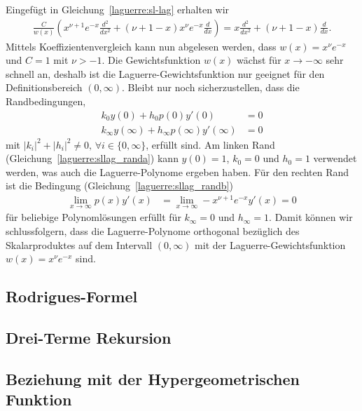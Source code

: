 Eingefügt in Gleichung~\eqref{laguerre:sl-lag} erhalten wir
\begin{align*}
\frac{C}{w(x)}
\left(
x^{\nu+1} e^{-x} \frac{d^2}{dx^2} +
(\nu + 1 - x) x^{\nu} e^{-x} \frac{d}{dx}
\right)
=
x \frac{d^2}{dx^2} + (\nu + 1 - x) \frac{d}{dx}.
\end{align*}
Mittels Koeffizientenvergleich kann nun abgelesen werden, dass $w(x) = x^\nu
e^{-x}$ und $C=1$ mit $\nu > -1$.
Die Gewichtsfunktion $w(x)$ wächst für $x\rightarrow-\infty$ sehr schnell an,
deshalb ist die Laguerre-Gewichtsfunktion nur geeignet für den
Definitionsbereich $(0, \infty)$.
Bleibt nur noch sicherzustellen, dass die Randbedingungen,
\begin{align}
k_0 y(0) + h_0 p(0)y'(0)
 & =
0
\label{laguerre:sllag_randa}
\\
k_\infty y(\infty) + h_\infty p(\infty) y'(\infty)
 & =
0
\label{laguerre:sllag_randb}
\end{align}
mit $|k_i|^2 + |h_i|^2 \neq 0,\,\forall i \in \{0, \infty\}$, erfüllt sind.
Am linken Rand (Gleichung~\eqref{laguerre:sllag_randa}) kann $y(0) = 1$, $k_0 =
0$ und $h_0 = 1$ verwendet werden,
was auch die Laguerre-Polynome ergeben haben.
Für den rechten Rand ist die Bedingung (Gleichung~\eqref{laguerre:sllag_randb})
\begin{align*}
\lim_{x \rightarrow \infty} p(x) y'(x)
 & =
\lim_{x \rightarrow \infty} -x^{\nu + 1} e^{-x} y'(x)
=
0
\end{align*}
für beliebige Polynomlösungen erfüllt für $k_\infty=0$ und $h_\infty=1$.
Damit können wir schlussfolgern, dass die Laguerre-Polynome orthogonal
bezüglich des Skalarproduktes auf dem Intervall $(0, \infty)$ mit der Laguerre\--Gewichtsfunktion 
$w(x)=x^\nu e^{-x}$ sind.


\subsection{Rodrigues-Formel}

\subsection{Drei-Terme Rekursion}

\subsection{Beziehung mit der Hypergeometrischen Funktion}

